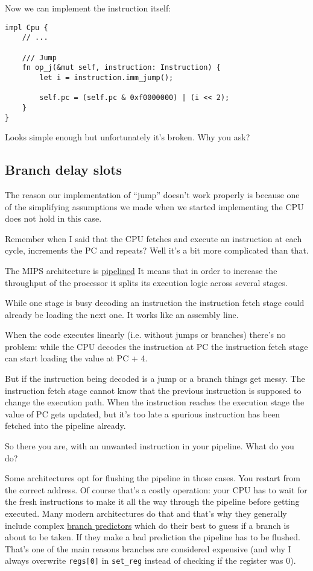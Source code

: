 \documentclass[a4paper]{article}
\newcommand{\code}[1] {\texttt{#1}}
\begin{document}
Now we can implement the instruction itself:

\begin{lstlisting}
impl Cpu {
    // ...

    /// Jump
    fn op_j(&mut self, instruction: Instruction) {
        let i = instruction.imm_jump();

        self.pc = (self.pc & 0xf0000000) | (i << 2);
    }
}
\end{lstlisting}

Looks simple enough but unfortunately it's broken. Why you ask?

\subsection{Branch delay slots}
\label{sec:bds}

The reason our implementation of ``jump'' doesn't work properly is
because one of the simplifying assumptions we made when we started
implementing the CPU does not hold in this case.

Remember when I said that the CPU fetches and execute an instruction
at each cycle, increments the PC and repeats? Well it's a bit more
complicated than that.

The MIPS architecture is
\href{https://en.wikipedia.org/wiki/Classic_RISC_pipeline}{pipelined}
It means that in order to increase the throughput of the processor it
splits its execution logic across several stages.

While one stage is busy decoding an instruction the instruction fetch
stage could already be loading the next one. It works like an assembly
line.

When the code executes linearly (i.e. without jumps or branches)
there's no problem: while the CPU decodes the instruction at PC the
instruction fetch stage can start loading the value at PC + 4.

But if the instruction being decoded is a jump or a branch things get
messy. The instruction fetch stage cannot know that the previous
instruction is supposed to change the execution path. When the
instruction reaches the execution stage the value of PC gets updated,
but it's too late a spurious instruction has been fetched into the
pipeline already.

So there you are, with an unwanted instruction in your pipeline. What
do you do?

Some architectures opt for flushing the pipeline in those cases. You
restart from the correct address. Of course that's a costly operation:
your CPU has to wait for the fresh instructions to make it all the way
through the pipeline before getting executed. Many modern
architectures do that and that's why they generally include complex
\href{https://en.wikipedia.org/wiki/Branch_predictor}{branch
  predictors} which do their best to guess if a branch is about to be
taken. If they make a bad prediction the pipeline has to be
flushed. That's one of the main reasons branches are considered
expensive (and why I always overwrite \code{regs[0]} in
\code{set\_reg} instead of checking if the register was 0).
\end{document}
